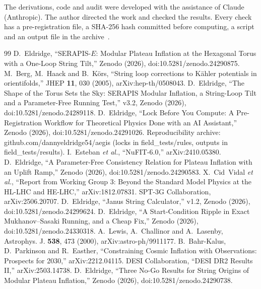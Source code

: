 \documentclass[aps,prd,twocolumn,superscriptaddress,nofootinbib,showkeys]{revtex4-2}
\begin{document}
\begin{acknowledgments}
The derivations, code and audit were developed with the assistance of Claude (Anthropic). The author directed the work and checked the results. Every check has a pre-registration file, a SHA-256 hash committed before computing, a script and an output file in the archive~\cite{AEGIS}.
\end{acknowledgments}

\begin{thebibliography}{99}
 D.~Eldridge, ``SERAPIS-$E$: Modular Plateau Inflation at the Hexagonal Torus with a One-Loop String Tilt,'' Zenodo (2026), doi:10.5281/zenodo.24290875.
 M.~Berg, M.~Haack and B.~K\"ors, ``String loop corrections to K\"ahler potentials in orientifolds,'' JHEP \textbf{11}, 030 (2005), arXiv:hep-th/0508043.
 D.~Eldridge, ``The Shape of the Torus Sets the Sky: SERAPIS Modular Inflation, a String-Loop Tilt and a Parameter-Free Running Test,'' v3.2, Zenodo (2026), doi:10.5281/zenodo.24289118.
 D.~Eldridge, ``Lock Before You Compute: A Pre-Registration Workflow for Theoretical Physics Done with an AI Assistant,'' Zenodo (2026), doi:10.5281/zenodo.24291026.
 Reproducibility archive: github.com/dannyeldridge54/aegis (locks in field\_tests/rules, outputs in field\_tests/results).
 I.~Esteban \emph{et al.}, ``NuFIT-6.0,'' arXiv:2410.05380.
 D.~Eldridge, ``A Parameter-Free Consistency Relation for Plateau Inflation with an Uplift Ramp,'' Zenodo (2026), doi:10.5281/zenodo.24290583.
 X.~Cid~Vidal \emph{et al.}, ``Report from Working Group 3: Beyond the Standard Model Physics at the HL-LHC and HE-LHC,'' arXiv:1812.07831.
 SPT-3G Collaboration, arXiv:2506.20707.
 D.~Eldridge, ``Janus String Calculator,'' v1.2, Zenodo (2026), doi:10.5281/zenodo.24299624.
 D.~Eldridge, ``A Start-Condition Ripple in Exact Mukhanov--Sasaki Running, and a Cheap Fix,'' Zenodo (2026), doi:10.5281/zenodo.24330318.
 A.~Lewis, A.~Challinor and A.~Lasenby, Astrophys. J. \textbf{538}, 473 (2000), arXiv:astro-ph/9911177.
 B.~Bahr-Kalus, D.~Parkinson and R.~Easther, ``Constraining Cosmic Inflation with Observations: Prospects for 2030,'' arXiv:2212.04115.
 DESI Collaboration, ``DESI DR2 Results II,'' arXiv:2503.14738.
 D.~Eldridge, ``Three No-Go Results for String Origins of Modular Plateau Inflation,'' Zenodo (2026), doi:10.5281/zenodo.24290738.
\end{thebibliography}
\end{document}
